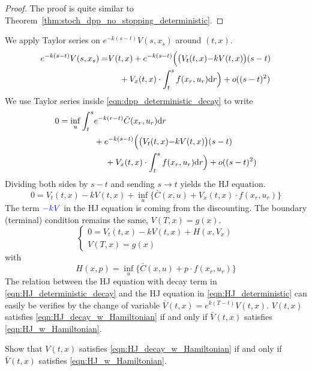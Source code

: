 \documentclass[11pt]{book}
\newcommand{\dr}{\text{\normalfont d}r}
\begin{document}
\begin{proof}
    The proof is quite similar to Theorem~\ref{thm:stoch_dpp_no_stopping_deterministic}.
\end{proof}
    We apply Taylor series on $e^{-k(s-t)}V(s,x_s)$ around $(t,x)$.
    \[
        \begin{split}
             {e^{-k(s-t)}}V(s,x_s) = &V(t,x) + {e^{-k(s-t)}}\Big(\big(V_t(t,x) {- k V(t,x)}\big)(s-t)\\
             &~~~~+ V_x(t,x)\cdot\int_t^s f(x_r,u_r)\dr\Big) + o((s-t)^2)
        \end{split}
        \]
       We use Taylor series inside \eqref{eqn:dpp_deterministic_decay} to write
        \[
        \begin{split}
            0=\inf_{u}\int_t^s &{e^{-k(r-t)}}\bar{C}(x_r,u_r)\dr \\
            &+  {e^{-k(s-t)}}\Big(\big(V_t(t,x) {- k V(t,x)}\big)(s-t)\\
             &~~~~+ V_x(t,x)\cdot\int_t^s f(x_r,u_r)\dr\Big) + o((s-t)^2)
        \end{split}
        \]
        Dividing both sides by $s-t$ and sending $s\to t$ yields the HJ equation.
        \begin{equation}
            \label{eqn:HJ_deterministic_decay}
            0=V_t(t,x) - k V(t,x)+\inf_{u}\Big\{\bar{C}(x,u) + V_x(t,x)\cdot f(x_r,u_r)\Big\}
        \end{equation}
        The term ${\color{blue}-kV}$ in the HJ equation is coming from the discounting. 
        The boundary (terminal) condition remains the same, $V(T,x)=g(x)$. 
        \begin{equation}
        \label{eqn:HJ_decay_w_Hamiltonian}
            \begin{cases}
                0=V_t(t,x) - k V(t,x)+H(x,V_x)\\
                V(T,x)=g(x)
            \end{cases}
        \end{equation}
        with
        \[
        H(x,p)=\inf_{u}\Big\{\bar{C}(x,u) + p\cdot f(x_r,u_r)\Big\}
        \]
        The relation between the HJ equation with decay term in \eqref{eqn:HJ_deterministic_decay} and the HJ equation in \eqref{eqn:HJ_deterministic} can easily be verifies by the change of variable $\bar{V}(t,x)=e^{k(T-t)}V(t,x)$. $V(t,x)$ satisfies \eqref{eqn:HJ_decay_w_Hamiltonian} if and only if $\bar{V}(t,x)$ satisfies \eqref{eqn:HJ_w_Hamiltonian}. 
        \begin{ex}
            Show that $V(t,x)$ satisfies \eqref{eqn:HJ_decay_w_Hamiltonian} if and only if $\bar{V}(t,x)$ satisfies \eqref{eqn:HJ_w_Hamiltonian}. 
        \end{ex}
    
\end{document}
